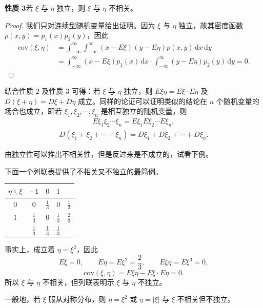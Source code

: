 \documentclass[../../main.tex]{subfiles}
\begin{document}
\noindent\textbf{性质 3}\quad 若 $\xi$ 与 $\eta$ 独立，则 $\xi$ 与 $\eta$ 不相关。

\begin{proof}
我们只对连续型随机变量给出证明。因为 $\xi$ 与 $\eta$ 独立，故其密度函数 $p(x,y)=p_1(x)p_2(y)$，因此
\begin{align*}
\mathrm{cov}(\xi,\eta)&=\int_{-\infty}^{\infty}\int_{-\infty}^{\infty}(x-E\xi)(y-E\eta)p(x,y)\,\mathrm{d}x\,\mathrm{d}y\\
&=\int_{-\infty}^{\infty}(x-E\xi)p_1(x)\,\mathrm{d}x\cdot\int_{-\infty}^{\infty}(y-E\eta)p_2(y)\,\mathrm{d}y=0.
\end{align*}
\end{proof}

结合性质 2 及性质 3 可得：若 $\xi$ 与 $\eta$ 独立，则 $E\xi\eta=E\xi\cdot E\eta$ 及 $D(\xi+\eta)=D\xi+D\eta$ 成立。同样的论证可以证明类似的结论在 $n$ 个随机变量的场合也成立，即若 $\xi_1,\xi_2,\cdots,\xi_n$ 是相互独立的随机变量，则
\begin{align}
E\xi_1\xi_2\cdots\xi_n=E\xi_1 E\xi_2\cdots E\xi_n,\label{align:ch04-独立乘积期望}
\end{align}
\begin{align}
D(\xi_1+\xi_2+\cdots+\xi_n)=D\xi_1+D\xi_2+\cdots+D\xi_n.\label{align:ch04-独立方差和}
\end{align}

由独立性可以推出不相关性，但是反过来是不成立的，试看下例。

\begin{example}[不相关又不独立的最简例]\label{example:ch04-不相关不独立}
下面一个列联表提供了不相关又不独立的最简例。
\begin{center}
\begin{tabular}{c|ccc|c}
$\eta\backslash\xi$ & $-1$ & $0$ & $1$ & \\
\hline
$0$ & $0$ & $\frac13$ & $0$ & $\frac13$\\
$1$ & $\frac13$ & $0$ & $\frac13$ & $\frac23$\\
\hline
 & $\frac13$ & $\frac13$ & $\frac13$ &
\end{tabular}
\end{center}
事实上，成立着 $\eta=\xi^2$，因此
\[
E\xi=0,\qquad E\eta=E\xi^2=\frac{2}{3},\qquad E\xi\eta=E\xi^3=0,
\]
\[
\mathrm{cov}(\xi,\eta)=E\xi\eta-E\xi\cdot E\eta=0.
\]
所以 $\xi$ 与 $\eta$ 不相关，但列联表明示 $\xi$ 与 $\eta$ 不独立。

一般地，若 $\xi$ 服从对称分布，则 $\eta=\xi^2$ 或 $\eta=|\xi|$ 与 $\xi$ 不相关但不独立。
\end{example}
\end{document}
